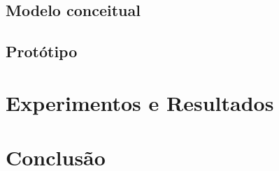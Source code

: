 \documentclass[pfc]{imetex}
\begin{document}
\section{Modelo conceitual}
\label{modelo}


\section{Protótipo}
\label{prototipo}


\chapter{Experimentos e Resultados}
\label{experimentos}

\chapter{Conclusão}
\label{conclusao}
\end{document}
